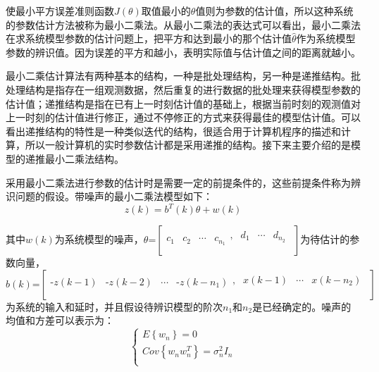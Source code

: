 使最小平方误差准则函数$J\left( \theta  \right)$取值最小的$\theta$值则为参数的估计值，所以这种系统的参数估计方法被称为最小二乘法。从最小二乘法的表达式可以看出，最小二乘法在求系统模型参数的估计问题上，把平方和达到最小的那个估计值$\hat{\theta }$作为系统模型参数的辨识值。因为误差的平方和越小，表明实际值与估计值之间的距离就越小。

最小二乘估计算法有两种基本的结构，一种是批处理结构，另一种是递推结构。批处理结构是指存在一组观测数据，然后重复的进行数据的批处理来获得模型参数的估计值；递推结构是指在已有上一时刻估计值的基础上，根据当前时刻的观测值对上一时刻的估计值进行修正，通过不停修正的方式来获得最佳的模型估计值。可以看出递推结构的特性是一种类似迭代的结构，很适合用于计算机程序的描述和计算，所以一般计算机的实时参数估计都是采用递推的结构。接下来主要介绍的是模型的递推最小二乘法结构。

采用最小二乘法进行参数的估计时是需要一定的前提条件的，这些前提条件称为辨识问题的假设。带噪声的最小二乘法模型如下：
\begin{equation}
z\left( k \right)={{b}^{T}}(k)\theta +w(k)
\end{equation}

其中$w(k)$为系统模型的噪声，$\theta \text{=}\left[ \begin{matrix}
   {{c}_{1}} & {{c}_{2}} & \cdots  & {{c}_{{{n}_{1}}}}\begin{matrix}
   , & {{d}_{1}} & \cdots  & {{d}_{{{n}_{2}}}}  \\
\end{matrix}  \\
\end{matrix} \right]$为待估计的参数向量，$b(k)\text{=}\left[ \begin{matrix}
   \text{-}z\left( k-1 \right) & \text{-}z\left( k-2 \right) & \cdots  & \text{-}z\left( k-{{n}_{1}} \right)\begin{matrix}
   , & x\left( k-1 \right) & \cdots  & x\left( k-{{n}_{2}} \right)  \\
\end{matrix}  \\
\end{matrix} \right]$\\为系统的输入和延时，并且假设待辨识模型的阶次${{n}_{1}}$和${{n}_{2}}$是已经确定的。噪声的均值和方差可以表示为：
\begin{equation}
\left\{  \begin{array}{l}
   E\left\{ {{w}_{n}} \right\}=0 \\ 
  Cov\left\{ {{w}_{n}}w_{n}^{T} \right\}=\sigma _{n}^{2}{{I}_{n}} \\ 
\end{array} \right.
\end{equation}

